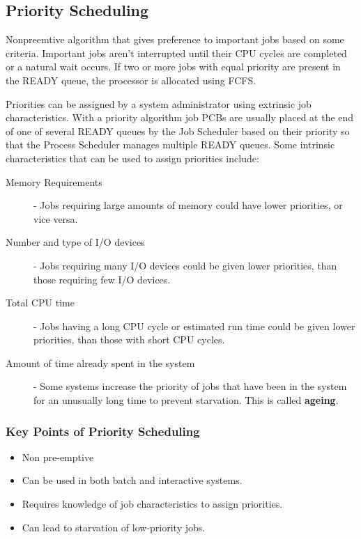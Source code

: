 \documentclass[12pt letter]{report}
\begin{document}
\subsection{Priority Scheduling}

Nonpreemtive algorithm that gives preference to important jobs based
on some criteria. Important jobs aren't interrupted until their CPU
cycles are completed or a natural wait occurs.  If two or more jobs
with equal priority are present in the READY queue, the processor is
allocated using FCFS.

Priorities can be assigned by a system administrator using extrinsic job
characteristics. With a priority algorithm job PCBs are usually
placed at the end of one of several READY queues by the Job Scheduler
based on their priority so that the Process Scheduler manages
multiple READY queues. Some intrinsic characteristics that can be
used to assign priorities include:
\begin{description}
  \item[Memory Requirements]  - Jobs requiring large amounts of
    memory could have lower priorities, or vice versa.
  \item[Number and type of I/O devices] - Jobs requiring many I/O
    devices could be given lower priorities, than those requiring few
    I/O devices.
  \item[Total CPU time] - Jobs having a long CPU cycle or estimated
    run time could be given lower priorities, than those with short CPU cycles.
  \item[Amount of time already spent in the system] - Some systems
    increase the priority of jobs that have been in the system for an
    unusually long time to prevent starvation. This is called \textbf{ageing}.
\end{description}

\subsubsection{Key Points of Priority Scheduling}
\begin{itemize}
  \item Non pre-emptive
  \item Can be used in both batch and interactive systems.
  \item Requires knowledge of job characteristics to assign priorities.
  \item Can lead to starvation of low-priority jobs.
\end{itemize}
\end{document}
